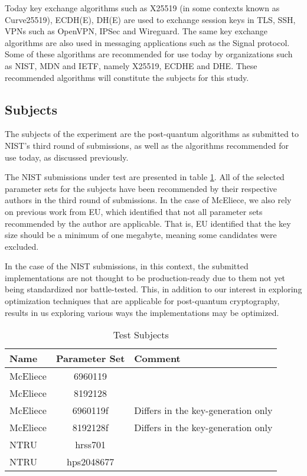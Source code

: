 
Today key exchange algorithms such as X25519 (in some contexts known as Curve25519), ECDH(E), DH(E) are used to exchange session keys in TLS, SSH, VPNs such as OpenVPN, IPSec and Wireguard. The same key exchange algorithms are also used in messaging applications such as the Signal protocol. Some of these algorithms are recommended for use today by organizations such as NIST, MDN and IETF, namely X25519, ECDHE and DHE. These recommended algorithms will constitute the subjects for this study.

\subsection{Subjects}

The subjects of the experiment are the post-quantum algorithms as submitted to NIST's third round of submissions, as well as the algorithms recommended for use today, as discussed previously.

The NIST submissions under test are presented in table \ref{table:method:experiment:test-subjects}. All of the selected parameter sets for the subjects have been recommended by their respective authors in the third round of submissions. In the case of McEliece, we also rely on previous work from EU, which identified that not all parameter sets recommended by the author are applicable. That is, EU identified that the key size should be a minimum of one megabyte, meaning some candidates were excluded.

In the case of the NIST submissions, in this context, the submitted implementations are not thought to be production-ready due to them not yet being standardized nor battle-tested. This, in addition to our interest in exploring optimization techniques that are applicable for post-quantum cryptography, results in us exploring various ways the implementations may be optimized.


\begin{table}[H]
    \centering
    \begin{tabular}{l|c|p{4cm}}
        Name & Parameter Set & Comment \\
        \hline
        McEliece & 6960119 & \\
        McEliece & 8192128 & \\
        McEliece & 6960119f & Differs in the key-generation only \\
        McEliece & 8192128f & Differs in the key-generation only\\
        NTRU & hrss701 & \\
        NTRU & hps2048677 & \\
    \end{tabular}
    \caption{Test Subjects}
    \label{table:method:experiment:test-subjects}
\end{table}

